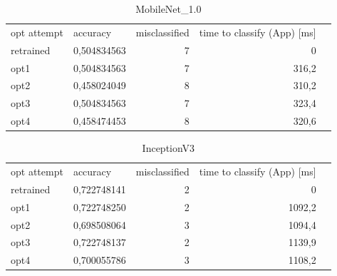 \begin{table}[]
\centering
\begin{tabular}{|l|r|r|r|l}
\cline{1-4}
opt attempt & \multicolumn{1}{l|}{accuracy} & \multicolumn{1}{l|}{misclassified} & \multicolumn{1}{l|}{time to classify (App) {[}ms{]}} &  \\ \cline{1-4}
retrained & 0,504834563                   & 7                                           & 0                                &  \\ \cline{1-4}
opt1      & 0,504834563                   & 7                                           & 316,2                            &  \\ \cline{1-4}
opt2      & 0,458024049                   & 8                                           & 310,2                           &  \\ \cline{1-4}
opt3      & 0,504834563                   & 7                                           & 323,4                            &  \\ \cline{1-4}
opt4      & 0,458474453                   & 8                                           & 320,6                           &  \\ \cline{1-4}
\end{tabular}
\caption{MobileNet_1.0}
\label{tab:mobileNet10}
\end{table}

\begin{table}[]
\centering
\begin{tabular}{|l|r|r|r|l}
\cline{1-4}
opt attempt & \multicolumn{1}{l|}{accuracy} & \multicolumn{1}{l|}{misclassified} & \multicolumn{1}{l|}{time to classify (App) {[}ms{]}} &  \\ \cline{1-4}
retrained   & 0,722748141                   & 2                                           & 0                                                    &  \\ \cline{1-4}
opt1        & 0,722748250                   & 2                                           & 1092,2                                              &  \\ \cline{1-4}
opt2        & 0,698508064                   & 3                                           & 1094,4                                               &  \\ \cline{1-4}
opt3        & 0,722748137                   & 2                                           & 1139,9                                               &  \\ \cline{1-4}
opt4        & 0,700055786                   & 3                                           & 1108,2                                               &  \\ \cline{1-4}
\end{tabular}
\caption{InceptionV3}
\label{tab:inception}
\end{table}
